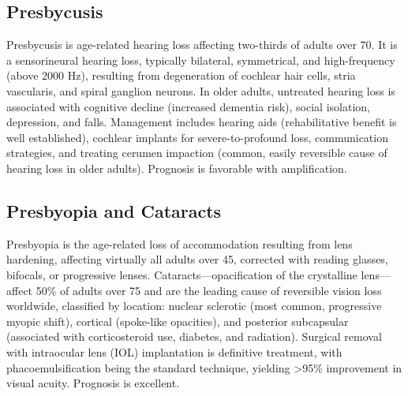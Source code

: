 \subsection{Presbycusis}
\label{sec:Presbycusis}
Presbycusis is age-related hearing loss affecting two-thirds of adults over 70. It is a sensorineural hearing loss, typically bilateral, symmetrical, and high-frequency (above 2000 Hz), resulting from degeneration of cochlear hair cells, stria vascularis, and spiral ganglion neurons. In older adults, untreated hearing loss is associated with cognitive decline (increased dementia risk), social isolation, depression, and falls. Management includes hearing aids (rehabilitative benefit is well established), cochlear implants for severe-to-profound loss, communication strategies, and treating cerumen impaction (common, easily reversible cause of hearing loss in older adults). Prognosis is favorable with amplification.

\subsection{Presbyopia and Cataracts}
\label{sec:Presbyopia and Cataracts}
Presbyopia is the age-related loss of accommodation resulting from lens hardening, affecting virtually all adults over 45, corrected with reading glasses, bifocals, or progressive lenses. Cataracts---opacification of the crystalline lens---affect 50\% of adults over 75 and are the leading cause of reversible vision loss worldwide, classified by location: nuclear sclerotic (most common, progressive myopic shift), cortical (spoke-like opacities), and posterior subcapsular (associated with corticosteroid use, diabetes, and radiation). Surgical removal with intraocular lens (IOL) implantation is definitive treatment, with phacoemulsification being the standard technique, yielding >95\% improvement in visual acuity. Prognosis is excellent.

